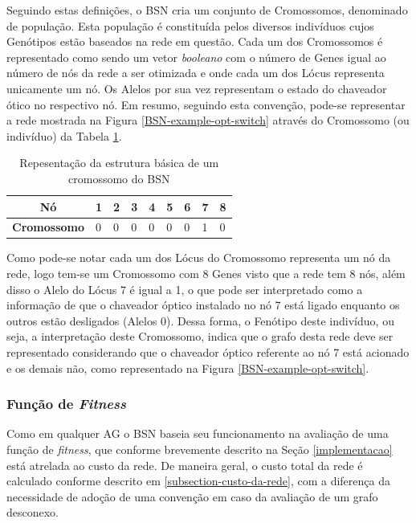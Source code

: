 Seguindo estas definições, o BSN cria um conjunto de Cromossomos, denominado de população. Esta população é constituída pelos diversos indivíduos cujos Genótipos estão baseados na rede em questão. Cada um dos Cromossomos é representado como sendo um vetor \emph{booleano} com o número de Genes igual ao número de nós da rede a ser otimizada e onde cada um dos Lócus representa unicamente um nó. Os Alelos por sua vez representam o estado do chaveador ótico no respectivo nó. Em resumo, seguindo esta convenção, pode-se representar a rede mostrada na Figura \ref{BSN-example-opt-switch} através do Cromossomo (ou indivíduo) da Tabela \ref{tab-cromossomo-bsn}.

\begin{table}[ht]
\centering
\begin{tabular}{|l|l|l|l|l|l|l|l|l|}
\hline
\multicolumn{1}{|c|}{\textbf{Nó}} & \multicolumn{1}{c|}{1} & 2 & 3 & 4 & 5 & 6 & 7 & 8 \\ \hline
\textbf{Cromossomo} & 0 & 0 & 0 & 0 & 0 & 0 & 1 & 0 \\ \hline
\end{tabular}
\caption[Cromossomo BSN]{Repesentação da estrutura básica de um cromossomo do BSN}
\label{tab-cromossomo-bsn}
\end{table}

Como pode-se notar cada um dos Lócus do Cromossomo representa um nó da rede, logo tem-se um Cromossomo com 8 Genes visto que a rede tem 8 nós, além disso o Alelo do Lócus 7 é igual a 1, o que pode ser interpretado como a informação de que o chaveador óptico instalado no nó 7 está ligado enquanto os outros estão desligados (Alelos 0). Dessa forma, o Fenótipo deste indivíduo, ou seja, a interpretação deste Cromossomo, indica que o grafo desta rede deve ser representado considerando que o chaveador óptico referente ao nó 7 está acionado e os demais não, como representado na Figura \ref{BSN-example-opt-switch}.

\subsubsection{Função de \emph{Fitness}}
Como em qualquer AG o BSN baseia seu funcionamento na avaliação de uma função de \emph{fitness}, que conforme brevemente descrito na Seção \ref{implementacao} está atrelada ao custo da rede. De maneira geral, o custo total da rede é calculado conforme descrito em \ref{subsection-custo-da-rede}, com a diferença da necessidade de adoção de uma convenção em caso da avaliação de um grafo desconexo.


